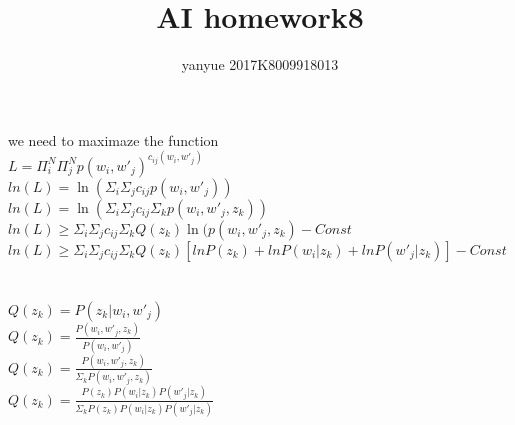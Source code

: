 \documentclass[]{article}
\title{AI homework8}
\author{yanyue 2017K8009918013}
\begin{document}
\maketitle

\section{}
we need to maximaze the function
\\$L = \Pi_i^N\Pi_j^N p(w_i,w'_j)^{c_{ij}(w_i,w'_j)}$
\\$ln(L) = \ln(\Sigma_i\Sigma_j c_{ij}p(w_i,w'_j))$
\\$ln(L) = \ln(\Sigma_i\Sigma_j c_{ij} \Sigma_kp(w_i,w'_j,z_k))$
\\$ln(L) \geq \Sigma_i\Sigma_j c_{ij} \Sigma_k Q(z_k) \ln(p(w_i,w'_j,z_k) - Const$
\\$ln(L) \geq \Sigma_i\Sigma_j c_{ij} \Sigma_k Q(z_k) [lnP(z_k) + lnP(w_i|z_k) + lnP(w'_j|z_k)] - Const$
\section{}
$Q(z_k) = P(z_k|w_i,w'_j)$
\\$Q(z_k) = \frac{P(w_i,w'_j,z_k)}{P(w_i,w'_j)}$
\\$Q(z_k) = \frac{P(w_i,w'_j,z_k)}{\Sigma_kP(w_i,w'_j,z_k)}$
\\$Q(z_k) = \frac{P(z_k)P(w_i|z_k)P(w'_j|z_k)}{\Sigma_kP(z_k)P(w_i|z_k)P(w'_j|z_k)}$
\end{document}
